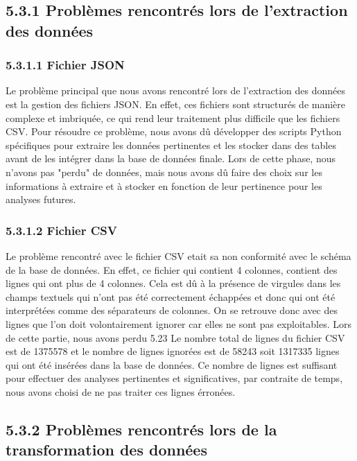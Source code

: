 \begin{itemize}
\begin{itemize}
\subsection{5.3.1 Problèmes rencontrés lors de l'extraction des données}


\subsubsection{5.3.1.1 Fichier JSON}

Le problème principal que nous avons rencontré lors de l'extraction des données est la gestion des fichiers JSON.
En effet, ces fichiers sont structurés de manière complexe et imbriquée, ce qui rend leur traitement plus difficile que les fichiers CSV.
Pour résoudre ce problème, nous avons dû développer des scripts Python spécifiques pour extraire les données pertinentes et les stocker dans des tables avant de les intégrer dans la base de données finale.
Lors de cette phase, nous n'avons pas "perdu" de données, mais nous avons dû faire des choix sur les informations à extraire et à stocker en fonction de leur pertinence pour les analyses futures.

\subsubsection{5.3.1.2 Fichier CSV}

Le problème rencontré avec le fichier CSV etait sa non conformité avec le schéma de la base de données.
En effet, ce fichier qui contient 4 colonnes, contient des lignes qui ont plus de 4 colonnes.
Cela est dû à la présence de virgules dans les champs textuels qui n'ont pas été correctement échappées et donc qui ont été interprétées comme des séparateurs de colonnes.
On se retrouve donc avec des lignes que l'on doit volontairement ignorer car elles ne sont pas exploitables.
Lors de cette partie, nous avons perdu 5.23%
Le nombre total de lignes du fichier CSV est de 1375578 et le nombre de lignes ignorées est de 58243 soit 1317335 lignes qui ont été insérées dans la base de données.
Ce nombre de lignes est suffisant pour effectuer des analyses pertinentes et significatives, par contraite de temps, nous avons choisi de ne pas traiter ces lignes érronées.


\subsection{5.3.2 Problèmes rencontrés lors de la transformation des données}


\end{itemize}
\end{itemize}
